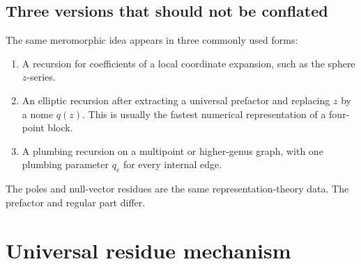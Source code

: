 \documentclass[11pt]{article}
\begin{document}
\subsection{Three versions that should not be conflated}

The same meromorphic idea appears in three commonly used forms:
\begin{enumerate}
 \item A recursion for coefficients of a local coordinate expansion, such
 as the sphere \(z\)-series.
 \item An elliptic recursion after extracting a universal prefactor and
 replacing \(z\) by a nome \(q(z)\).  This is usually the fastest numerical
 representation of a four-point block.
 \item A plumbing recursion on a multipoint or higher-genus graph, with one
 plumbing parameter \(q_e\) for every internal edge.
\end{enumerate}
The poles and null-vector residues are the same representation-theory data.
The prefactor and regular part differ.

\section{Universal residue mechanism}
\label{sec:universal-residue}
\end{document}
